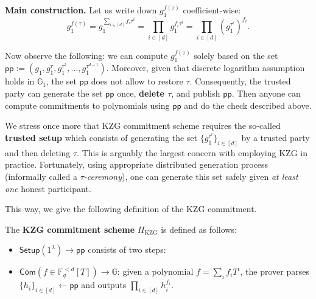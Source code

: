 \documentclass[../../book]{subfiles}
\begin{document}
\textbf{Main construction.} Let us write down $g_1^{f(\tau)}$ coefficient-wise:
\begin{equation*}
    g_1^{f(\tau)} = g_1^{\sum_{i \in [d]}f_i\tau^i} = \prod_{i \in [d]}g_1^{f_i\tau^i} = \prod_{i \in [d]}(g_1^{\tau^i})^{f_i}.
\end{equation*}

Now observe the following: we can compute $g_1^{f(\tau)}$ solely based on the set $\mathsf{pp} := (g_1,g_1^{\tau},g_1^{\tau^2},\dots,g_1^{\tau^{d-1}})$.
Moreover, given that discrete logarithm assumption holds in $\mathbb{G}_1$, the set $\mathsf{pp}$ does not allow to restore $\tau$.
Consequently, the trusted party can generate the set $\mathsf{pp}$ once, \textbf{delete $\tau$}, and publish $\mathsf{pp}$.
Then anyone can compute commitments to polynomials using $\mathsf{pp}$ and do the check described above.

\begin{remark}
    We stress once more that KZG commitment scheme requires the so-called \textbf{trusted setup} which consists of generating the set $\{g_1^{\tau^i}\}_{i \in [d]}$ by a trusted party and then deleting $\tau$.
    This is arguably the largest concern with employing KZG in practice.
    Fortunately, using appropriate distributed generation process (informally called a \emph{$\tau$-ceremony}), one can generate this set safely given \textit{at least one} honest participant.
\end{remark}

This way, we give the following definition of the KZG commitment.

\begin{definition}\label{def:kzg-com}
    The \textbf{KZG commitment scheme} $\Pi_{\text{KZG}}$ is defined as follows:
    \begin{itemize}
        \item $\mathsf{Setup}(1^{\lambda}) \to \mathsf{pp}$ consists of two steps: 
        \item $\mathsf{Com}(f \in \mathbb{F}_q^{<d}[T]) \to \mathbb{G}$: given a polynomial $f = \sum_i f_iT^i$, the prover parses $\{h_i\}_{i \in [d]} \gets \mathsf{pp}$ and outputs $\prod_{i \in [d]} h_i^{f_i}$.
    \end{itemize}
\end{definition}
\end{document}
